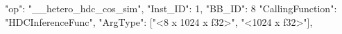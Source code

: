 {
    "op": "__hetero_hdc_cos_sim",
    "Inst_ID": 1,
    "BB_ID": 8
    "CallingFunction": "HDCInferenceFunc",
    "ArgType": ["<8 x 1024 x f32>", "<1024 x f32>"],
}
